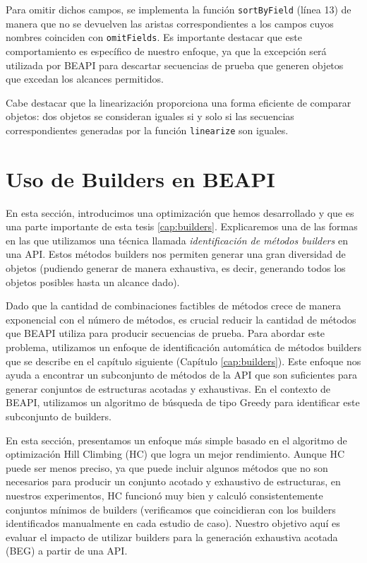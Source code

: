 Para omitir dichos campos, se implementa la función \texttt{sortByField} (línea 13) de manera que no se devuelven las aristas correspondientes a los campos cuyos nombres coinciden con \texttt{omitFields}. Es importante destacar que este comportamiento es específico de nuestro enfoque, ya que la excepción será utilizada por \textsf{BEAPI} para descartar secuencias de prueba que generen objetos que excedan los alcances permitidos.

Cabe destacar que la linearización proporciona una forma eficiente de comparar objetos: dos objetos se consideran iguales si y solo si las secuencias correspondientes generadas por la función \texttt{linearize} son iguales.


\section{Uso de Builders en BEAPI}
\label{sec:builders}
En esta sección, introducimos una optimización que hemos desarrollado y que es una parte importante de esta tesis \ref{cap:builders}. Explicaremos una de las formas en las que utilizamos una técnica llamada \emph{identificación de métodos builders} en una API. Estos métodos builders nos permiten generar una gran diversidad de objetos (pudiendo generar de manera exhaustiva, es decir, generando todos los objetos posibles hasta un alcance dado).

Dado que la cantidad de combinaciones factibles de métodos crece de manera exponencial con el número de métodos, es crucial reducir la cantidad de métodos que \textsf{BEAPI} utiliza para producir secuencias de prueba. Para abordar este problema, utilizamos un enfoque de identificación automática de métodos builders que se describe en el capítulo siguiente (Capítulo \ref{cap:builders}). Este enfoque nos ayuda a encontrar un subconjunto de métodos de la API que son suficientes para generar conjuntos de estructuras acotadas y exhaustivas. En el contexto de \textsf{BEAPI}, utilizamos un algoritmo de búsqueda de tipo Greedy para identificar este subconjunto de builders.

En esta sección, presentamos un enfoque más simple basado en el algoritmo de optimización Hill Climbing (HC) que logra un mejor rendimiento. Aunque HC puede ser menos preciso, ya que puede incluir algunos métodos que no son necesarios para producir un conjunto acotado y exhaustivo de estructuras, en nuestros experimentos, HC funcionó muy bien y calculó consistentemente conjuntos mínimos de builders (verificamos que coincidieran con los builders identificados manualmente en cada estudio de caso). Nuestro objetivo aquí es evaluar el impacto de utilizar builders para la generación exhaustiva acotada (BEG) a partir de una API.

